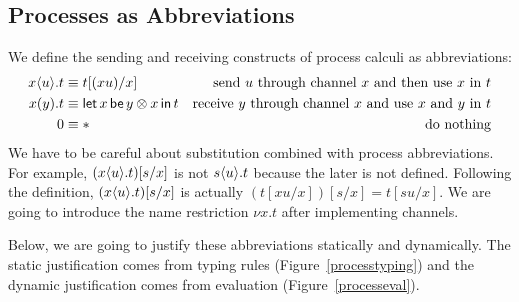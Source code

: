     \subsection{Processes as Abbreviations}

    We define the sending and receiving constructs of process calculi as
    abbreviations:
    \begin{align*}
     {x}\langle{u}\rangle.{t} &\equiv t[(xu) /x] &\text{send $u$ through channel
     $x$ and then use $x$ in $t$} \\
     {{x}({y}).{t}} &\equiv \mathsf{let }\,{x}\,\mathsf{ be }\,{y\otimes x}\,\mathsf{ in }\,{t} & \text{receive
     $y$ through channel $x$ and use $x$ and $y$ in $t$} \\
     0 &\equiv \ast &\text{do nothing}
    \end{align*}
    We have to be careful about substitution combined with process
    abbreviations.
    For example, $({x}\langle{u}\rangle.{t})[s/x]$ is not ${s}\langle{u}\rangle.{t}$
    because the later is not defined.  Following the definition,
    $({x}\langle{u}\rangle.{t})[s/x]$ is actually $(t[xu/x])[s/x] = t[su/x]$.
    We are going to introduce the name restriction $\nu x.t$ after
    implementing channels.

    Below, we are going to justify these abbreviations statically and
    dynamically.
    The static justification comes from typing rules
    (Figure~\ref{processtyping}) and the dynamic justification comes from
    evaluation (Figure~\ref{processeval}).

